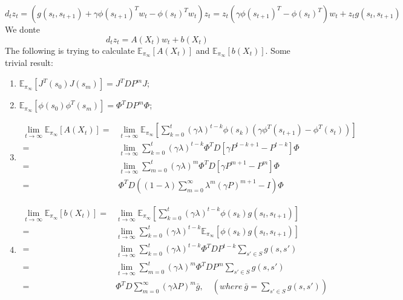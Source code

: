 \[
    d_t z_t = (g(s_t, s_{t+1}) + \gamma {\phi(s_{t+1})}^T w_t - {\phi(s_t)}^{T} w_t) z_t
    = z_t \left( \gamma {\phi(s_{t+1})}^T - {\phi(s_t)}^{T} \right) w_t + z_t g(s_t, s_{t+1})
\]
We donte
\[
    d_t z_t = A(X_t) w_t + b(X_t) 
\]
The following is trying to calculate $ \mathbb{E}_{\pi_{\infty}}\left[ A(X_t) \right] $ and $ \mathbb{E}_{\pi_{\infty} } \left[ b(X_t) \right]$.
Some trivial result:
\begin{enumerate}
    \item $ \mathbb{E}_{\pi_{\infty}} \left[ J^T(s_0) J(s_m) \right] = J^T D P^{m} J $;
    \item $ \mathbb{E}_{\pi_{\infty}} \left[ \phi(s_0) \phi^T(s_m) \right] = \Phi^T D P^m \Phi$;
    \item 
        \begin{align*}
           \lim_{t \to \infty} \mathbb{E}_{\pi_{\infty}} \left[ A(X_t) \right] 
           =& \lim_{t \to \infty} \mathbb{E}_{\pi_{\infty}} \left[\sum^{t}_{k=0} {(\gamma\lambda)}^{t-k }\phi(s_k)(\gamma\phi^T (s_{t+1}) - \phi^T(s_t))\right]\\
           =& \lim_{t \to \infty} \sum^{t}_{k=0} {(\gamma \lambda)}^{t-k}\Phi^{T} D \left[ \gamma P^{t-k+1} - P^{t-k} \right] \Phi\\
           =& \lim_{t \to \infty} \sum^{t}_{m = 0} {(\gamma\lambda)}^{m} \Phi^T D \left[ \gamma P^{m+1} - P^{m} \right] \Phi\\
           =& \Phi^T D \left( (1 - \lambda) \sum^{\infty}_{m=0} \lambda^m{(\gamma P)}^{m+1} - I \right) \Phi
        \end{align*}
    \item 
        \begin{align*}
            \lim_{t \to \infty} \mathbb{E}_{\pi_{\infty}}\left[ b(X_t) \right]
            =& \lim_{t \to \infty} \mathbb{E}_{\pi_{\infty}}\left[ \sum^{t}_{k=0} {(\gamma\lambda)}^{t-k} \phi(s_k) g(s_t,s_{t+1}) \right]\\
            =& \lim_{t \to \infty} \sum^{t}_{k=0} {(\gamma\lambda)}^{t-k} \mathbb{E}_{\pi_{\infty}} \left[ \phi(s_k) g(s_t, s_{t+1}) \right]\\
            =& \lim_{t \to \infty} \sum^{t}_{k=0} {(\gamma\lambda)}^{t-k} \Phi^T D P^{t-k} \sum^{}_{s' \in S} g(s, s')\\
            =& \lim_{t \to \infty} \sum^{t}_{m=0} {(\gamma\lambda)}^{m} \Phi^{T} D P^{m} \sum^{}_{s' \in S} g(s,s')\\
            =& \Phi^T D \sum^{\infty}_{m=0} {(\gamma\lambda P)}^m \bar g, \quad \left( where\ \bar g = \sum^{}_{s' \in S} g(s, s') \right)

\end{align*}
\end{enumerate}
